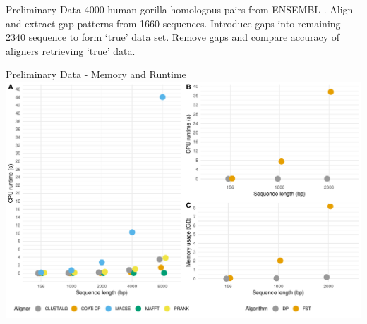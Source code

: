 \documentclass{beamer}
\begin{document}


\begin{frame}{Preliminary Data} %
4000 human-gorilla homologous pairs from ENSEMBL \parencite{ensembl_hubbard_2002}.
Align and extract gap patterns from 1660 sequences.
Introduce gaps into remaining 2340 sequence to form `true' data set.
Remove gaps and compare accuracy of aligners retrieving `true' data.
\vspace{2em}

\resizebox{\linewidth}{!}{%
\hspace{0.7cm}\centering{}
}
\end{frame} %

\begin{frame}{Preliminary Data - Memory and Runtime} %
\includegraphics[scale=0.45,center]{fig-benchmark.pdf}
\end{frame} %
\end{document}
